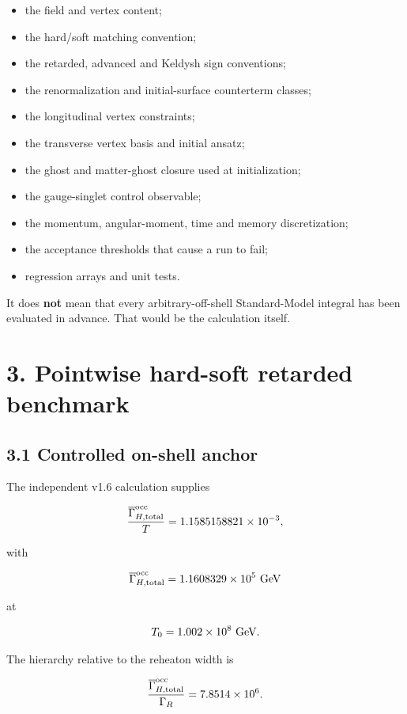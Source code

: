 \documentclass[
  10pt,
]{article}
\providecommand{\tightlist}{%
  \setlength{\itemsep}{0pt}\setlength{\parskip}{0pt}}
\begin{document}
\begin{itemize}
\tightlist
\item
  the field and vertex content;
\item
  the hard/soft matching convention;
\item
  the retarded, advanced and Keldysh sign conventions;
\item
  the renormalization and initial-surface counterterm classes;
\item
  the longitudinal vertex constraints;
\item
  the transverse vertex basis and initial ansatz;
\item
  the ghost and matter-ghost closure used at initialization;
\item
  the gauge-singlet control observable;
\item
  the momentum, angular-moment, time and memory discretization;
\item
  the acceptance thresholds that cause a run to fail;
\item
  regression arrays and unit tests.
\end{itemize}

It does \textbf{not} mean that every arbitrary-off-shell Standard-Model
integral has been evaluated in advance. That would be the calculation
itself.

\section{3. Pointwise hard-soft retarded
benchmark}\label{pointwise-hard-soft-retarded-benchmark}

\subsection{3.1 Controlled on-shell
anchor}\label{controlled-on-shell-anchor}

The independent v1.6 calculation supplies

\[
\frac{\overline\Gamma_{H,\rm total}^{\rm occ}}{T}
=
1.1585158821\times10^{-3},
\]

with

\[
\overline\Gamma_{H,\rm total}^{\rm occ}
=
1.1608329\times10^5\ {\rm GeV}
\]

at

\[
T_0=1.002\times10^8\ {\rm GeV}.
\]

The hierarchy relative to the reheaton width is

\[
\frac{\overline\Gamma_{H,\rm total}^{\rm occ}}{\Gamma_R}
=
7.8514\times10^6.
\]
\end{document}

